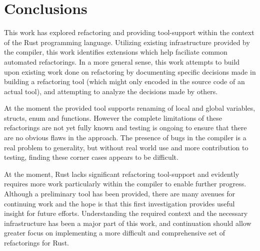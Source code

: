 \chapter{Conclusions}\label{C:con}
This work has explored refactoring and providing tool-support within the context of the Rust programming language. Utilizing existing infrastructure provided by the compiler, this work identifies extensions which help faciliate common automated refactorings. In a more general sense, this work attempts to build upon existing work done on refactoring by documenting specific decisions made in building a refactoring tool (which might only encoded in the source code of an actual tool), and attempting to analyze the decisions made by others.


At the moment the provided tool supports renaming of local and global variables, structs, enum and functions. However the complete limitations of these refactorings are not yet fully known and testing is ongoing to ensure that there are no obvious flaws in the approach. The presence of bugs in the compiler is a real problem to generality, but without real world use and more contribution to testing, finding these corner cases appears to be difficult.

At the moment, Rust lacks significant refactoring tool-support and evidently requires more work particularly within the compiler to enable further progress. Although a preliminary tool has been provided, there are many avenues for continuing work and the hope is that this first investigation provides useful insight for future efforts. Understanding the required context and the necessary infrastructure has been a major part of this work, and continuation should allow greater focus on implementing a more difficult and comprehensive set of refactorings for Rust.